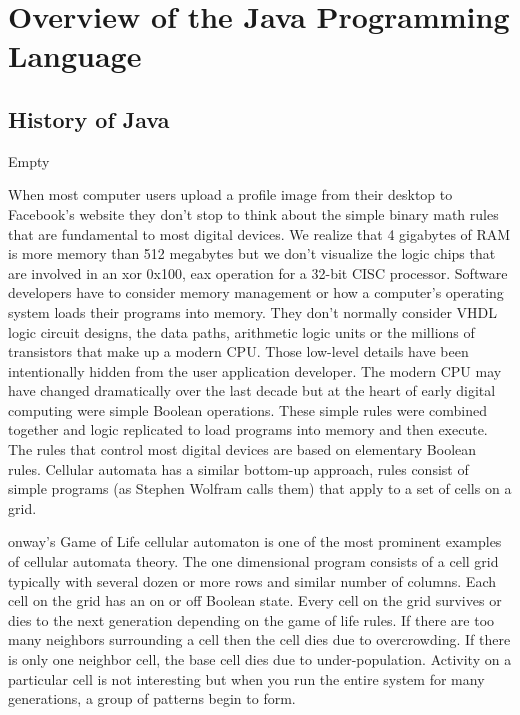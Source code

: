 \chapter{Overview of the Java Programming Language}

\section {History of Java}
Empty

When most computer users upload a profile image
from their desktop to Facebook's website they don't 
stop to think about the simple binary math rules that are fundamental
to most digital devices. 
We realize that 4 gigabytes of RAM is more memory than 
512 megabytes but we don't visualize the logic chips 
that are involved in an xor 0x100, eax operation for a 
32-bit CISC processor. Software developers have to 
consider memory management or how a computer's 
operating system loads their programs into memory. They don't normally
consider VHDL logic circuit designs, the data paths, arithmetic logic
units or the millions of transistors that make up a modern CPU. Those
low-level details have been intentionally hidden from the user
application developer. The modern CPU may have changed dramatically
over the last decade but at the heart of early digital computing were
simple Boolean operations. These simple rules were combined together
and logic replicated to load programs into memory and then
execute. The rules that control most digital devices are based on
elementary Boolean rules. Cellular automata has a similar bottom-up
approach, rules consist of simple programs (as Stephen Wolfram calls
them) that apply to a set of cells on a grid.

onway's Game of Life cellular automaton is one of the most prominent examples of cellular automata theory. The one dimensional program consists of a cell grid typically with several dozen or more rows and similar number of columns. Each cell on the grid has an on or off Boolean state. Every cell on the grid survives or dies to the next generation depending on the game of life rules. If there are too many neighbors surrounding a cell then the cell dies due to overcrowding. If there is only one neighbor cell, the base cell dies due to under-population. Activity on a particular cell is not interesting but when you run the entire system for many generations, a group of patterns begin to form.

